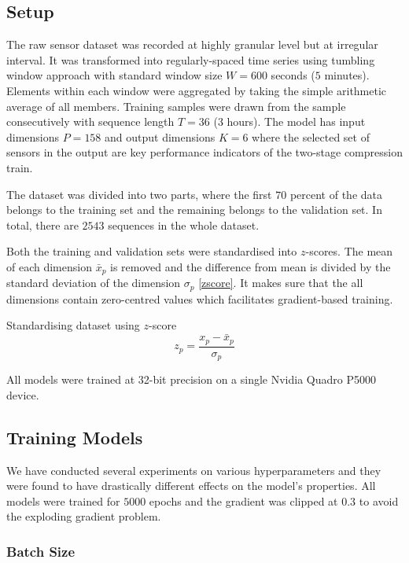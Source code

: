 \documentclass[11pt]{article} %
\theoremstyle{plain}
\theoremstyle{definition}
\begin{document}
\subsection{Setup}

The raw sensor dataset was recorded at highly granular level but at irregular interval. It was transformed into regularly-spaced time series using tumbling window approach with standard window size \(W=600\) seconds (\(5\) minutes). Elements within each window were aggregated by taking the simple arithmetic average of all members. Training samples were drawn from the sample consecutively with sequence length \(T=36\) (\(3\) hours). The model has input dimensions \(P=158\) and output dimensions \(K=6\) where the selected set of sensors in the output are key performance indicators of the two-stage compression train.

The dataset was divided into two parts, where the first \(70\) percent of the data belongs to the training set and the remaining belongs to the validation set. In total, there are \(2543\) sequences in the whole dataset.

Both the training and validation sets were standardised into \(z\)-scores. The mean of each dimension \(\bar{x}_p\) is removed and the difference from mean is divided by the standard deviation of the dimension \(\sigma_p\) \eqref{zscore}. It makes sure that the all dimensions contain zero-centred values which facilitates gradient-based training.

Standardising dataset using \(z\)-score
\begin{equation}
\label{zscore}
z_p=\frac{x_p-\bar{x}_p}{\sigma_p}
\end{equation}

All models were trained at 32-bit precision on a single Nvidia Quadro P5000 device.

\subsection{Training Models}

We have conducted several experiments on various hyperparameters and they were found to have drastically different effects on the model's properties. All models were trained for \(5000\) epochs and the gradient was clipped at \(0.3\) to avoid the exploding gradient problem.

\subsubsection{Batch Size}
\end{document}
